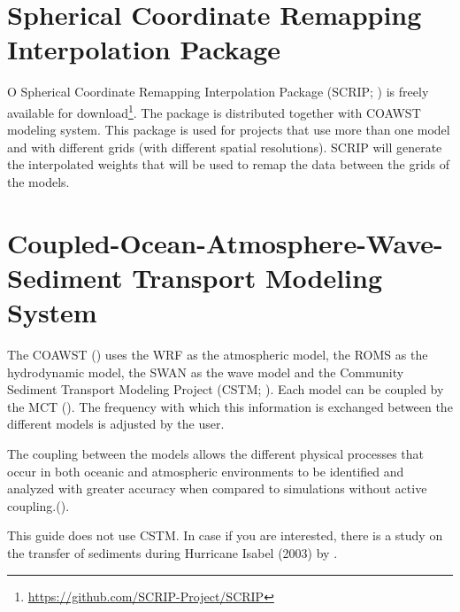 \section{Spherical Coordinate Remapping Interpolation Package}\label{scripsecao}
\bigskip

 O  Spherical Coordinate Remapping Interpolation Package (SCRIP; \cite{Jones1999,Jones1998}) is freely available for
download\textcolor{bleu_cite}{\textit{}\footnote{\textcolor{bleu_cite}{\href{https://github.com/SCRIP-Project/SCRIP}{https://github.com/SCRIP-Project/SCRIP}}}}. 
The package is distributed together with COAWST modeling system. This package is used for projects that use more than one model and with different grids (with different spatial 
resolutions). SCRIP will generate the interpolated weights that will be used to remap the data between the grids of the models.
\bigskip


\section{Coupled-Ocean-Atmosphere-Wave-Sediment Transport Modeling System}\label{coawstsecao}
\bigskip
 The COAWST (\cite{Warner2010,Warner2008}) uses the WRF as the atmospheric model, the ROMS as the hydrodynamic model, the SWAN as the wave model and the
Community Sediment Transport Modeling Project (CSTM; \cite{Warner2008}). Each model can be coupled by the MCT (\cite{Warner2010, Warner2008}). The frequency with which this information is
exchanged between the different models is adjusted by the user.
\bigskip

 The coupling between the models allows the different physical processes that occur in both oceanic and atmospheric environments to be identified and analyzed with greater accuracy 
when compared to simulations without active coupling.(\cite{Pullen2018, Miller2018}).
\bigskip

\begin{tcolorbox}[enhanced,
  grow to left by   = 0cm,
  grow to right by  = 0cm,
  enlarge top by    = 0cm,
  enlarge bottom by = 0cm,
  tcbox raise base,
  boxrule           = 1.0pt,
  left              = 18mm,
  colframe          = red!50!black,coltext=red!25!black,colback=red!10!white,
  overlay           = {\begin{tcbclipinterior}\fill[red!75!blue!50!white] (frame.south west)
    rectangle node[text=white,font=\sffamily\bfseries\footnotesize,rotate=0] {WARNING} ([xshift=18mm]frame.north west);\end{tcbclipinterior}}]
    This guide does not use CSTM. In case if you are interested, there is a study on the transfer of sediments during Hurricane Isabel (2003) by \textcite{Warner2010}.
\end{tcolorbox}
\bigskip


